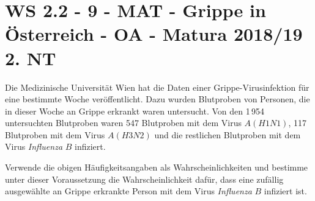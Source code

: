 \section{WS 2.2 - 9 - MAT - Grippe in Österreich - OA - Matura 2018/19 2. NT}

\begin{beispiel}[WS 2.2]{1}
Die Medizinische Universität Wien hat die Daten einer Grippe-Virusinfektion für eine bestimmte Woche veröffentlicht. Dazu wurden Blutproben von Personen, die in dieser Woche an Grippe erkrankt waren untersucht. Von den 1\,954 untersuchten Blutproben waren 547 Blutproben mit dem Virus $A(H1N1)$, 117 Blutproben mit dem Virus $A(H3N2)$ und die restlichen Blutproben mit dem Virus \textit{Influenza} $B$ infiziert.

Verwende die obigen Häufigkeitsangaben als Wahrscheinlichkeiten und bestimme unter dieser Voraussetzung die Wahrscheinlichkeit dafür, dass eine zufällig ausgewählte an Grippe erkrankte Person mit dem Virus \textit{Influenza} $B$ infiziert ist.

\end{beispiel}